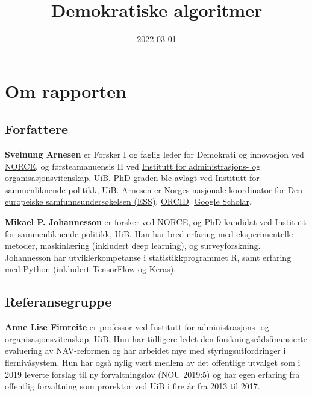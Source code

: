 \documentclass[
]{book}
\title{Demokratiske algoritmer}
\author{}
\date{\vspace{-2.5em}2022-03-01}
\begin{document}
\maketitle

{
\setcounter{tocdepth}{1}
\tableofcontents
}
\hypertarget{om}{%
\chapter{Om rapporten}\label{om}}

\hypertarget{forfattere}{%
\section{Forfattere}\label{forfattere}}

\textbf{Sveinung Arnesen} er Forsker I og faglig leder for Demokrati og innovasjon ved \href{https://www.norceresearch.no/personer/sveinung-arnesen}{NORCE}, og førsteamanuensis II ved \href{https://www.uib.no/personer/Sveinung.Arnesen}{Institutt for administrasjons- og organisasjonsvitenskap}, UiB.
PhD-graden ble avlagt ved \href{https://www.uib.no/sampol}{Institutt for sammenliknende politikk, UiB}.
Arnesen er Norges nasjonale koordinator for \href{europeansocialsurvey.org}{Den europeiske samfunnsundersøkelsen (ESS)}. \href{https://orcid.org/0000-0002-2825-0664}{ORCID}. \href{https://scholar.google.com/citations?user=xz8JwjAAAAAJ\&hl=no\&oi=ao}{Google Scholar}.

\textbf{Mikael P. Johannesson} er forsker ved NORCE, og PhD-kandidat ved Institutt for sammenliknende politikk, UiB.
Han har bred erfaring med eksperimentelle metoder, maskinlæring (inkludert deep learning), og surveyforskning.
Johannesson har utviklerkompetanse i statistikkprogrammet R, samt erfaring med Python (inkludert TensorFlow og Keras).

\hypertarget{referansegruppe}{%
\section{Referansegruppe}\label{referansegruppe}}

\textbf{Anne Lise Fimreite} er professor ved \href{https://www.uib.no/personer/Anne.Lise.Fimreite}{Institutt for administrasjons- og organisasjonsvitenskap}, UiB.
Hun har tidligere ledet den forskningsrådsfinansierte evaluering av NAV-reformen og har arbeidet mye med styringsutfordringer i flernivåsystem.
Hun har også nylig vært medlem av det offentlige utvalget som i 2019 leverte forslag til ny forvaltningslov (NOU 2019:5) og har egen erfaring fra offentlig forvaltning som prorektor ved UiB i fire år fra 2013 til 2017.
\end{document}
